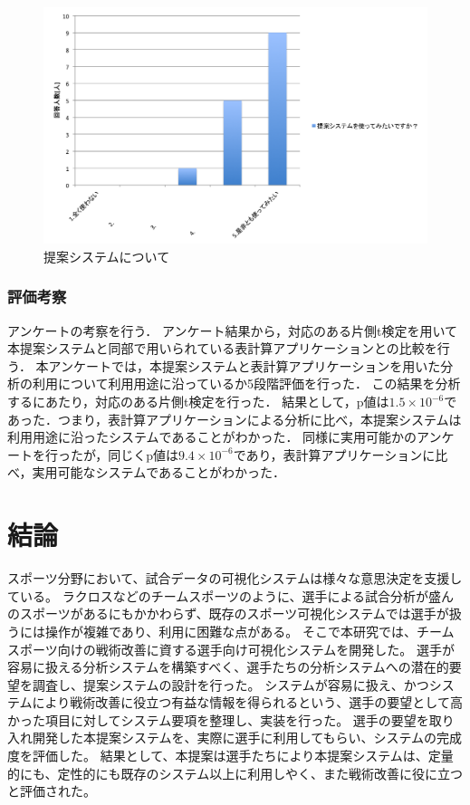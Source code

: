 \documentclass[sotsuron]{kuee}
\begin{document}
			\begin{figure}
				\begin{center}
					\includegraphics[width=\linewidth]{./png/result08.png}
				\end{center}
				\caption{提案システムについて}
		  		\label{fig:result08}
			\end{figure}
		\subsection{評価考察}
			アンケートの考察を行う．
			アンケート結果から，対応のある片側t検定を用いて本提案システムと同部で用いられている表計算アプリケーションとの比較を行う．
			本アンケートでは，本提案システムと表計算アプリケーションを用いた分析の利用について利用用途に沿っているか5段階評価を行った．
			この結果を分析するにあたり，対応のある片側t検定を行った．
			結果として，p値は$1.5 \times 10^{-6}$であった．つまり，表計算アプリケーションによる分析に比べ，本提案システムは利用用途に沿ったシステムであることがわかった．
			同様に実用可能かのアンケートを行ったが，同じくp値は$9.4 \times 10^{-6}$であり，表計算アプリケーションに比べ，実用可能なシステムであることがわかった．

\chapter{結論}
	スポーツ分野において、試合データの可視化システムは様々な意思決定を支援している。
	ラクロスなどのチームスポーツのように、選手による試合分析が盛んのスポーツがあるにもかかわらず、既存のスポーツ可視化システムでは選手が扱うには操作が複雑であり、利用に困難な点がある。
	そこで本研究では、チームスポーツ向けの戦術改善に資する選手向け可視化システムを開発した。
	選手が容易に扱える分析システムを構築すべく、選手たちの分析システムへの潜在的要望を調査し、提案システムの設計を行った。
	システムが容易に扱え、かつシステムにより戦術改善に役立つ有益な情報を得られるという、選手の要望として高かった項目に対してシステム要項を整理し、実装を行った。
	選手の要望を取り入れ開発した本提案システムを、実際に選手に利用してもらい、システムの完成度を評価した。
	結果として、本提案は選手たちにより本提案システムは、定量的にも、定性的にも既存のシステム以上に利用しやく、また戦術改善に役に立つと評価された。
\end{document}
